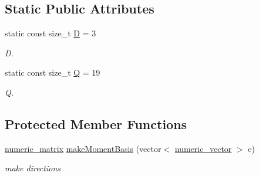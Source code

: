 \subsection*{Static Public Attributes}
\begin{DoxyCompactItemize}
\item 
\hypertarget{classnatrium_1_1D3Q19_a1eade3a56682d2e2f5533c811fc169fd}{
static const size\_\-t \hyperlink{classnatrium_1_1D3Q19_a1eade3a56682d2e2f5533c811fc169fd}{D} = 3}
\label{classnatrium_1_1D3Q19_a1eade3a56682d2e2f5533c811fc169fd}

\begin{DoxyCompactList}\small\item\em D. \item\end{DoxyCompactList}\item 
\hypertarget{classnatrium_1_1D3Q19_a8fa668ebc269adc347899954b189a2fb}{
static const size\_\-t \hyperlink{classnatrium_1_1D3Q19_a8fa668ebc269adc347899954b189a2fb}{Q} = 19}
\label{classnatrium_1_1D3Q19_a8fa668ebc269adc347899954b189a2fb}

\begin{DoxyCompactList}\small\item\em Q. \item\end{DoxyCompactList}\end{DoxyCompactItemize}
\subsection*{Protected Member Functions}
\begin{DoxyCompactItemize}
\item 
\hypertarget{classnatrium_1_1D3Q19_a959800e25ea362884f9aa93665f3429d}{
\hyperlink{namespacenatrium_ad8cbec7aab93a74837b06ded39615d47}{numeric\_\-matrix} \hyperlink{classnatrium_1_1D3Q19_a959800e25ea362884f9aa93665f3429d}{makeMomentBasis} (vector$<$ \hyperlink{namespacenatrium_a67c39077adc6634f8fa3762b8eef24c4}{numeric\_\-vector} $>$ e)}
\label{classnatrium_1_1D3Q19_a959800e25ea362884f9aa93665f3429d}

\begin{DoxyCompactList}\small\item\em make directions \item\end{DoxyCompactList}\end{DoxyCompactItemize}
